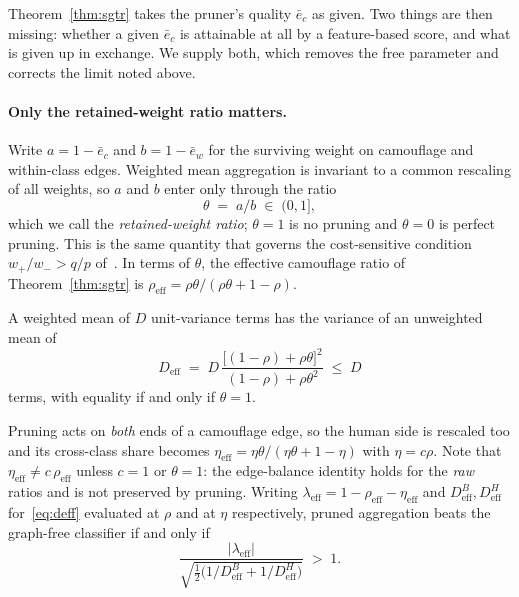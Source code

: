 \documentclass[../elsevier.tex]{subfiles}
\begin{document}
Theorem~\ref{thm:sgtr} takes the pruner's quality $\bar e_c$ as given. Two things
are then missing: whether a given $\bar e_c$ is attainable at all by a
feature-based score, and what is given up in exchange. We supply both, which
removes the free parameter and corrects the limit noted above.

\paragraph{Only the retained-weight ratio matters.}
Write $a = 1-\bar e_c$ and $b = 1-\bar e_w$ for the surviving weight on camouflage
and within-class edges. Weighted mean aggregation is invariant to a common rescaling
of all weights, so $a$ and $b$ enter only through the ratio
\begin{equation}
    \theta \;=\; a/b \;\in\; (0,1] ,
    \label{eq:theta}
\end{equation}
which we call the \emph{retained-weight ratio}; $\theta = 1$ is no pruning and
$\theta = 0$ is perfect pruning. This is the same quantity that governs the
cost-sensitive condition $w_+/w_- > q/p$ of~\citep{weiss2026cost}. In terms of
$\theta$, the effective camouflage ratio of Theorem~\ref{thm:sgtr} is
$\rho_{\mathrm{eff}} = \rho\theta/(\rho\theta + 1-\rho)$.

\begin{proposition}
\label{prop:deff}
A weighted mean of $D$ unit-variance terms has the variance of an unweighted mean
of
\begin{equation}
    D_{\mathrm{eff}}
    \;=\; D\,\frac{\bigl[(1-\rho) + \rho\theta\bigr]^2}
                   {(1-\rho) + \rho\theta^{2}}
    \;\leq\; D
    \label{eq:deff}
\end{equation}
terms, with equality if and only if $\theta = 1$.

Pruning acts on \emph{both} ends of a camouflage edge, so the human side is
rescaled too and its cross-class share becomes
$\eta_{\mathrm{eff}} = \eta\theta/(\eta\theta + 1-\eta)$ with $\eta = c\rho$. Note
that $\eta_{\mathrm{eff}} \neq c\,\rho_{\mathrm{eff}}$ unless $c=1$ or $\theta=1$:
the edge-balance identity holds for the \emph{raw} ratios and is not preserved by
pruning. Writing
$\lambda_{\mathrm{eff}} = 1 - \rho_{\mathrm{eff}} - \eta_{\mathrm{eff}}$ and
$D^{B}_{\mathrm{eff}}, D^{H}_{\mathrm{eff}}$ for~\eqref{eq:deff} evaluated at $\rho$
and at $\eta$ respectively, pruned aggregation beats the graph-free classifier if and
only if
\begin{equation}
    \frac{|\lambda_{\mathrm{eff}}|}
         {\sqrt{\tfrac12\bigl(1/D^{B}_{\mathrm{eff}} + 1/D^{H}_{\mathrm{eff}}\bigr)}}
    \;>\; 1 .
    \label{eq:pruned-condition}
\end{equation}
\end{proposition}
\end{document}

